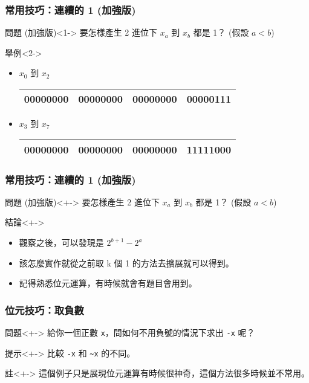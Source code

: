 \documentclass[utf8]{beamer}
\begin{document}
\begin{CJK}{UTF8}{bkai}
\begin{frame}[fragile]
  \frametitle{常用技巧：連續的 1 (加強版)}
  \begin{block}{問題 \alert{(加強版)}}<1->
  要怎樣產生 2 進位下 $x_a$ 到 $x_b$ 都是 1？ (假設 $a<b$)
  \end{block}
  \begin{exampleblock}{舉例}<2->
    \begin{itemize}
    \item $x_0$ 到 $x_2$ 
      \begin{table}[h]
        \begin{tabular}{|c|c|c|c|}
        \hline
        00000000 & 00000000 & 00000000 & 00000\alert{111}\\
        \hline
        \end{tabular}
      \end{table}
    \item<4-> $x_3$ 到 $x_7$
      \begin{table}[h]
        \begin{tabular}{|c|c|c|c|}
        \hline
        00000000 & 00000000 & 00000000 & \alert{11111}000\\
        \hline
        \end{tabular}
      \end{table}
    \end{itemize}
  \end{exampleblock}
\end{frame}

\begin{frame}[fragile]
  \frametitle{常用技巧：連續的 1 (加強版)}
  \begin{block}{問題 \alert{(加強版)}}<+->
  要怎樣產生 2 進位下 $x_a$ 到 $x_b$ 都是 1？ (假設 $a<b$)
  \end{block}
  \begin{alertblock}{結論}<+->
    \begin{itemize}
    \item 觀察之後，可以發現是 $2^{b+1}-2^a$
    \item<+-> 該怎麼實作就從之前取 k 個 1 的方法去擴展就可以得到。
    \item<+-> 記得熟悉位元運算，有時候就會有題目會用到。
    \end{itemize}
  \end{alertblock}
\end{frame}

\begin{frame}[fragile]
  \frametitle{位元技巧：取負數}
  \begin{alertblock}{問題}<+->
  給你一個正數 \lstinline{x}{}，問如何不用負號的情況下求出 \lstinline{-x}{} 呢？
  \end{alertblock}
  \begin{block}{提示}<+->
  比較 \lstinline{-x}{} 和 \lstinline{~x}{} 的不同。
  \end{block}
  \begin{exampleblock}{註}<+->
  這個例子只是展現位元運算有時候很神奇，這個方法很多時候並不常用。
  \end{exampleblock}
\end{frame}


\end{CJK}
\end{document}

